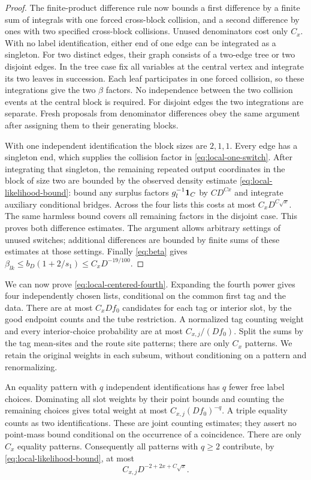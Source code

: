 \begin{proof}
The finite-product difference rule now bounds a first difference by
a finite sum of integrals with one forced cross-block collision,
and a second difference by ones with two specified cross-block
collisions.  Unused denominators cost only $C_x$.  With no label
identification, either end of one edge can be integrated as a
singleton.  For two distinct edges, their graph consists of a
two-edge tree or two disjoint edges.  In the tree case fix all
variables at the central vertex and integrate its two leaves in
succession.  Each leaf participates in one forced collision, so these
integrations give the two $\beta$ factors.  No independence between
the two collision events at the central block is required.  For
disjoint edges the two integrations are separate.  Fresh proposals
from denominator differences obey the same argument after assigning
them to their generating blocks.

With one independent identification the block sizes are $2,1,1$.
Every edge has a singleton end, which supplies the collision factor
in \eqref{eq:local-one-switch}.  After integrating that singleton,
the remaining repeated output coordinates in the block of size two
are bounded by the observed density estimate
\eqref{eq:local-likelihood-bound}: bound any surplus factors
$g_l^{-1}\mathbf 1_C$ by $CD^{Cx}$ and integrate auxiliary conditional
bridges.  Across the four lists this costs at most
$C_xD^{C\sqrt x}$.  The same harmless bound covers all remaining
factors in the disjoint case.  This proves both difference estimates.
The argument allows arbitrary settings of unused switches; additional
differences are bounded by finite sums of these estimates at those
settings.  Finally \eqref{eq:beta} gives
$\beta_{lk}\le b_D(1+2/s_1)\le C_xD^{-19/100}$.
\end{proof}

We can now prove \eqref{eq:local-centered-fourth}.  Expanding the
fourth power gives four independently chosen lists, conditional on
the common first tag and the data.  There are at most $C_xDf_0$
candidates for each tag or interior slot, by the good endpoint
counts and the tube restriction.  A normalized tag counting weight
and every interior-choice probability are at most $C_{x,j}/(Df_0)$.
Split the sums by the tag mean-sites and the route site patterns;
there are only $C_x$ patterns.  We retain the original weights in
each subsum, without conditioning on a pattern and renormalizing.

An equality pattern with $q$ independent identifications has $q$
fewer free label choices.  Dominating all slot weights by their
point bounds and counting the remaining choices gives total weight
at most $C_{x,j}(Df_0)^{-q}$.  A triple equality counts as two
identifications.  These are joint counting estimates; they assert
no point-mass bound conditional on the occurrence of a coincidence.
There are only $C_x$ equality patterns.  Consequently all patterns
with $q\ge2$ contribute, by \eqref{eq:local-likelihood-bound}, at most
\begin{equation}\label{eq:local-many-identifications}
                         C_{x,j}D^{-2+2x+C\sqrt x}.
\end{equation}


